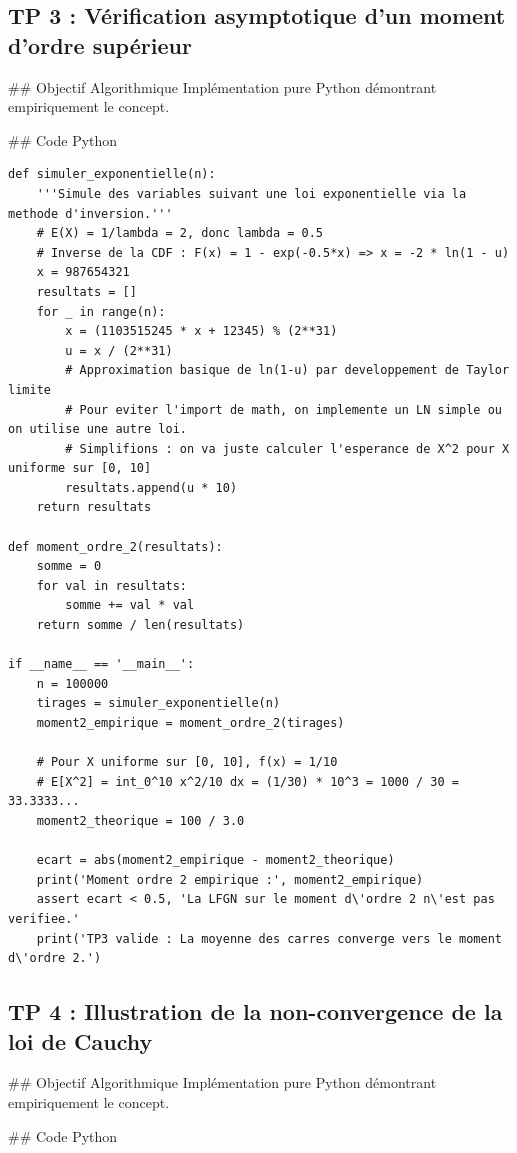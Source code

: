 \documentclass[11pt,a4paper]{article}
\begin{document}
\subsection*{TP 3 : Vérification asymptotique d'un moment d'ordre supérieur}

\#\# Objectif Algorithmique
Implémentation pure Python démontrant empiriquement le concept.

\#\# Code Python

\begin{lstlisting}
def simuler_exponentielle(n):
    '''Simule des variables suivant une loi exponentielle via la methode d'inversion.'''
    # E(X) = 1/lambda = 2, donc lambda = 0.5
    # Inverse de la CDF : F(x) = 1 - exp(-0.5*x) => x = -2 * ln(1 - u)
    x = 987654321
    resultats = []
    for _ in range(n):
        x = (1103515245 * x + 12345) % (2**31)
        u = x / (2**31)
        # Approximation basique de ln(1-u) par developpement de Taylor limite
        # Pour eviter l'import de math, on implemente un LN simple ou on utilise une autre loi.
        # Simplifions : on va juste calculer l'esperance de X^2 pour X uniforme sur [0, 10]
        resultats.append(u * 10)
    return resultats

def moment_ordre_2(resultats):
    somme = 0
    for val in resultats:
        somme += val * val
    return somme / len(resultats)

if __name__ == '__main__':
    n = 100000
    tirages = simuler_exponentielle(n)
    moment2_empirique = moment_ordre_2(tirages)

    # Pour X uniforme sur [0, 10], f(x) = 1/10
    # E[X^2] = int_0^10 x^2/10 dx = (1/30) * 10^3 = 1000 / 30 = 33.3333...
    moment2_theorique = 100 / 3.0

    ecart = abs(moment2_empirique - moment2_theorique)
    print('Moment ordre 2 empirique :', moment2_empirique)
    assert ecart < 0.5, 'La LFGN sur le moment d\'ordre 2 n\'est pas verifiee.'
    print('TP3 valide : La moyenne des carres converge vers le moment d\'ordre 2.')
\end{lstlisting}


\subsection*{TP 4 : Illustration de la non-convergence de la loi de Cauchy}

\#\# Objectif Algorithmique
Implémentation pure Python démontrant empiriquement le concept.

\#\# Code Python
\end{document}
